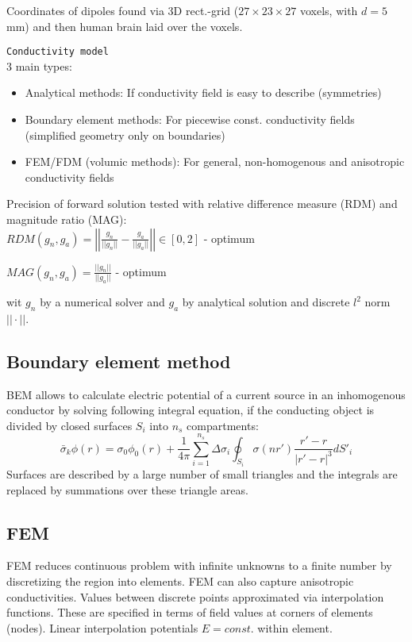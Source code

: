 Coordinates of dipoles found via 3D rect.-grid ($27\times 23\times 27$ voxels, with $d=5$ mm) and then human brain laid over the voxels.

\verb!Conductivity model!\\
3 main types: 
\begin{itemize}
\item Analytical methods: If conductivity field is easy to describe (symmetries)
\item Boundary element methods: For piecewise const. conductivity fields (simplified geometry only on boundaries)
\item FEM/FDM (volumic methods): For general, non-homogenous and anisotropic conductivity fields
\end{itemize}\vs

Precision of forward solution tested with relative difference measure (RDM) and magnitude ratio (MAG):\\
$RDM(g_n,g_a) = \left|\left|\frac{g_n}{||g_n||}-\frac{g_a}{||g_a||}\right|\right| \in [0,2]$ - optimum \vs

$MAG(g_n,g_a) = \frac{||g_n||}{||g_a||}$ - optimum  \vs

wit $g_n$ by a numerical solver and $g_a$ by analytical solution and discrete $l^2$ norm $||\cdot||$.\vs

\subsection{Boundary element method}
BEM allows to calculate electric potential of a current source in an inhomogenous conductor by solving  following integral equation, if the conducting object is divided by closed surfaces $S_i$ into $n_s$ compartments:
\begin{equation*}
\bar{\sigma}_k \phi(r) = \sigma_0\phi_0(r) + \frac{1}{4\pi}\sum_{i=1}^{n_s} \Delta\sigma_i \oint_{S_i} \sigma(nr') \frac{r'-r}{|r'-r|^3} dS'_i
\end{equation*}
Surfaces are described by a large number of small triangles and the integrals are replaced by summations over these triangle areas.


\subsection{FEM}
FEM reduces continuous problem with infinite unknowns to a finite number by discretizing the region into elements. FEM can also capture anisotropic conductivities. Values between discrete points approximated via interpolation functions. These are specified in terms of field values at corners of elements (nodes). Linear interpolation potentials \arr $E = const.$ within element.\vs

